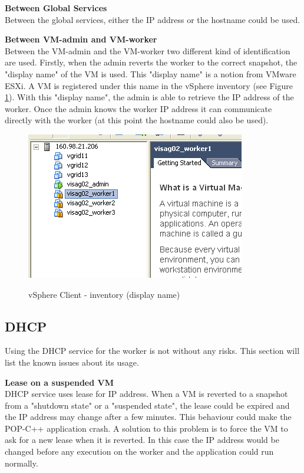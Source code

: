 \textbf{Between Global Services}\\
Between the global services, either the IP address or the hostname could be used. \s

\textbf{Between VM-admin and VM-worker}\\
Between the VM-admin and the VM-worker two different kind of identification are used. Firstly, when the admin reverts the worker to the correct snapshot, the "display name" of the VM is used. This "display name" is a notion from VMware ESXi. A VM is registered under this name in the vSphere inventory (see Figure \ref{fig:vsphere}). With this "display name", the admin is able to retrieve the IP address of the worker. Once the admin knows the worker IP address it can communicate directly with the worker (at this point the hostname could also be used). 

\begin{figure}[ht]
	\caption{vSphere Client - inventory (display name)}
  	\centering
	\includegraphics[scale=1.0]{../inventory.png}
	\label{fig:vsphere}
\end{figure}

\subsection{DHCP}
Using the DHCP service for the worker is not without any risks. This section will list the known issues about its usage. \s

\textbf{Lease on a suspended VM}\\
DHCP service uses lease for IP address. When a VM is reverted to a snapshot from a "shutdown state" or a "suspended state", the lease could be expired and the IP address may change after a few minutes. This behaviour could make the POP-C++ application crash. A solution to this problem is to force the VM to ask for a new lease when it is reverted. In this case the IP address would be changed before any execution on the worker and the application could run normally. 





